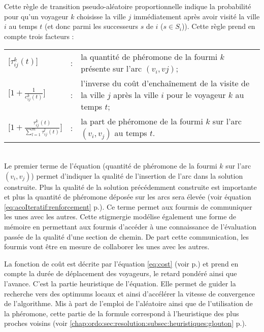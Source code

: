 Cette règle de transition pseudo-aléatoire proportionnelle indique la probabilité pour qu'un voyageur $k$ choisisse la ville $j$ immédiatement après avoir visité la ville $i$ au temps $t$ (et donc parmi les successeurs $s$ de $i$ ($s \in S_i$)). Cette règle prend en compte trois facteurs :

\begin{tabular}[\textwidth]{m{2.5cm} m{0.2cm} m{11.5cm}}
 $\Big[\tau^k_{ij}(t)\Big]$ & : & la quantité de phéromone de la fourmi $k$ présente sur l'arc $(v_i,vj)$; \\
 $\Big[1 + \frac{1}{c^k_{ij}(t)}\Big]$ & : & l'inverse du coût d'enchaînement de la visite de la ville $j$ après la ville $i$ pour le voyageur $k$ au temps $t$;\\%
 $\Big[1 + \frac{\tau^k_{ij}(t)}{\sum \limits_{l=1}^{m} \tau^l_{ij}(t)}\Big]$ & : & la part de phéromone de la fourmi $k$ sur l'arc $(v_i,v_j)$ au temps $t$.
\end{tabular}\\

Le premier terme de l'équation (quantité de phéromone de la fourmi $k$ sur l'arc $(v_i,v_j)$) permet d'indiquer la qualité de l'insertion de l'arc dans la solution construite. Plus la qualité de la solution précédemment construite est importante et plus la quantité de phéromone déposée sur les arcs sera élevée (voir équation \ref{eq:acoIteratif:renforcement} p.\pageref{eq:acoIteratif:renforcement}). Ce terme permet aux fourmis de communiquer les unes avec les autres. Cette stigmergie modélise également une forme de mémoire en permettant aux fourmis d'accéder à une connaissance de l'évaluation passée de la qualité d'une section de chemin. De part cette communication, les fourmis vont être en mesure de collaborer les unes avec les autres.

La fonction de coût est décrite par l'équation \ref{eq:cost} (voir p.\pageref{eq:cost}) et prend en compte la durée de déplacement des voyageurs, le retard pondéré ainsi que l'avance. C'est la partie heuristique de l'équation. Elle permet de guider la recherche vers des optimums locaux et ainsi d'accélérer la vitesse de convergence de l'algorithme. Mis à part de l'emploi de l'aléatoire ainsi que de l'utilisation de la phéromone, cette partie de la formule correspond à l'heuristique des plus proches voisins (voir \ref{chap:ordo:sec:resolution:subsec:heuristiques:glouton} p.\pageref{chap:ordo:sec:resolution:subsec:heuristiques:glouton}).

